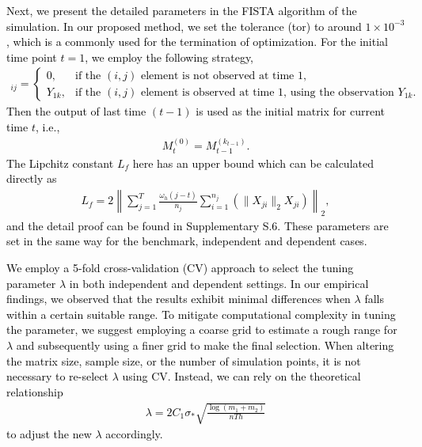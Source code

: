 \documentclass[12pt]{article}
\newcommand{\change}[1]{\textcolor{black}{#1}}
\begin{document}
\change{
Next, we present the  detailed parameters in the FISTA algorithm of the simulation.
In our proposed method, we set the tolerance (tor) to around $1\times 10^{-3}$, which is a commonly used for the termination of optimization. For the initial time point $t=1$, we employ the following strategy,
{\small\begin{align*}
    [M_{1}^{(0)}]_{ij} = \left\{\begin{array}{ll}
        0, & \text{if the $(i,j)$ element is not observed at time 1,} \\
        Y_{1k}, & \text{if the $(i,j)$ element is observed at time 1, using the observation $Y_{1k}.$}
    \end{array}\right.
\end{align*} }
Then the output of last time $(t-1)$ is used as the initial matrix for current time $t$, i.e., 
\begin{align*}
    M_{t}^{(0)} = M_{t-1}^{(k_{t-1})}.
\end{align*}
The Lipchitz constant $L_f$ here has an upper bound which can be calculated directly as
\begin{align*}
    L_f = 2\left\|\sum_{j=1}^T \frac{\omega_h(j-t)}{n_j}\sum_{i=1}^{n_j} (\|X_{ji}\|_2X_{ji})\right\|_2,
\end{align*}
and the detail proof can be found in Supplementary S.6. 
These parameters are set in the same way for the benchmark, independent and dependent cases.
}

\change{
We employ a 5-fold cross-validation (CV) approach to select the tuning parameter $\lambda$ in both independent and dependent settings. In our empirical findings, we observed that the results exhibit minimal differences when $\lambda$ falls within a certain suitable range. To mitigate computational complexity in tuning the parameter, we suggest employing a coarse grid to estimate a rough range for $\lambda$ and subsequently using a finer grid to make the final selection. When altering the matrix size, sample size, or the number of simulation points, it is not necessary to re-select $\lambda$ using CV. Instead, we can rely on the theoretical relationship
\begin{align*}
    \lambda = 2C_1\sigma_*\sqrt{\frac{\log(m_1+m_2)}{nTh}}
\end{align*}
to adjust the new $\lambda$ accordingly.
}
\end{document}
